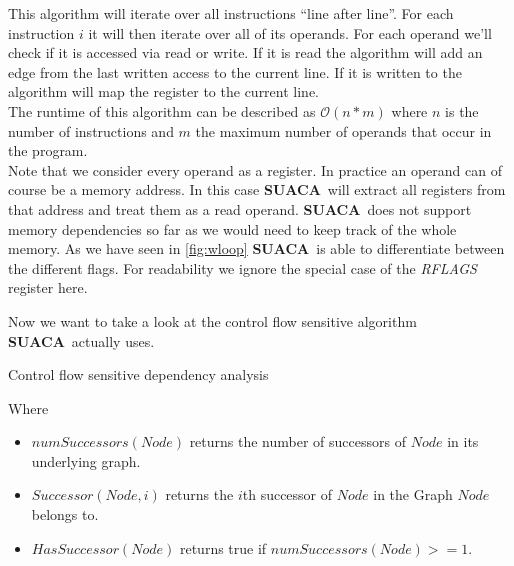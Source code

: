 \documentclass[a4paper,12pt,titlepage, twoside]{report}
\newcommand{\suaca}{\textbf{SUACA}}
\begin{document}
This algorithm will iterate over all instructions ``line after line''. For each instruction $i$ it will then iterate over all of its operands. For each operand we'll check if it is accessed via read or write. If it is read the algorithm will add an edge from the last written access to the current line. If it is written to the algorithm will map the register to the current line.\\

The runtime of this algorithm can be described as $\mathcal{O}(n*m)$ where $n$ is the number of instructions and $m$ the maximum number of operands that occur in the program.\\

Note that we consider every operand as a register. In practice an operand can of course be a memory address. In this case \suaca\ will extract all registers from that address and treat them as a read operand. \suaca\ does not support memory dependencies so far as we would need to keep track of the whole memory. As we have seen in \autoref{fig:wloop} \suaca\ is able to differentiate between the different flags. For readability we ignore the special case of the \emph{RFLAGS} register here.

Now we want to take a look at the control flow sensitive algorithm \suaca\ actually uses. 

\begin{algorithm}[H]
    \SetAlgoLined
    \caption{Control flow sensitive dependency analysis}
    \label{alg:dep}
\end{algorithm}

Where
\begin{itemize}
    \item $numSuccessors(Node)$ returns the number of successors of $Node$ in its underlying graph.
    \item $Successor(Node, i)$ returns the $i$th successor of $Node$ in the Graph $Node$ belongs to.
    \item $HasSuccessor(Node)$ returns true if $numSuccessors(Node) >= 1$.
\end{itemize}
\end{document}

